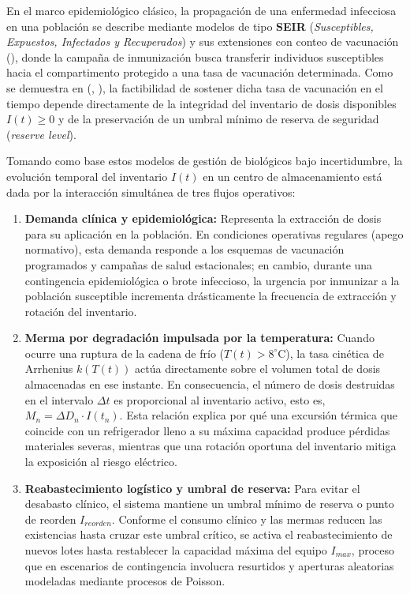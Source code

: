 \documentclass[
  spanish,
  us-letterpaper,
]{scrreprt}
\providecommand{\tightlist}{%
  \setlength{\itemsep}{0pt}\setlength{\parskip}{0pt}}
\numberwithin{equation}{section}
\theoremstyle{plain}
\theoremstyle{plain}
\theoremstyle{definition}
\theoremstyle{plain}
\theoremstyle{remark}
\begin{document}
En el marco epidemiológico clásico, la propagación de una enfermedad
infecciosa en una población se describe mediante modelos de tipo
\textbf{SEIR} (\emph{Susceptibles, Expuestos, Infectados y Recuperados})
y sus extensiones con conteo de vacunación
(), donde la campaña de inmunización busca transferir individuos
susceptibles hacia el compartimento protegido a una tasa de vacunación
determinada. Como se demuestra en
(, ), la
factibilidad de sostener dicha tasa de vacunación en el tiempo depende
directamente de la integridad del inventario de dosis disponibles
\(I(t) \ge 0\) y de la preservación de un umbral mínimo de reserva de
seguridad (\emph{reserve level}).

Tomando como base estos modelos de gestión de biológicos bajo
incertidumbre, la evolución temporal del inventario \(I(t)\) en un
centro de almacenamiento está dada por la interacción simultánea de tres
flujos operativos:

\begin{enumerate}
\def\labelenumi{\arabic{enumi}.}
\tightlist
\item
  \textbf{Demanda clínica y epidemiológica:} Representa la extracción de
  dosis para su aplicación en la población. En condiciones operativas
  regulares (apego normativo), esta demanda responde a los esquemas de
  vacunación programados y campañas de salud estacionales; en cambio,
  durante una contingencia epidemiológica o brote infeccioso, la
  urgencia por inmunizar a la población susceptible incrementa
  drásticamente la frecuencia de extracción y rotación del inventario.
\item
  \textbf{Merma por degradación impulsada por la temperatura:} Cuando
  ocurre una ruptura de la cadena de frío (\(T(t) > 8^\circ\text{C}\)),
  la tasa cinética de Arrhenius \(k(T(t))\) actúa directamente sobre el
  volumen total de dosis almacenadas en ese instante. En consecuencia,
  el número de dosis destruidas en el intervalo \(\Delta t\) es
  proporcional al inventario activo, esto es,
  \(M_n = \Delta D_n \cdot I(t_n)\). Esta relación explica por qué una
  excursión térmica que coincide con un refrigerador lleno a su máxima
  capacidad produce pérdidas materiales severas, mientras que una
  rotación oportuna del inventario mitiga la exposición al riesgo
  eléctrico.
\item
  \textbf{Reabastecimiento logístico y umbral de reserva:} Para evitar
  el desabasto clínico, el sistema mantiene un umbral mínimo de reserva
  o punto de reorden \(I_{reorden}\). Conforme el consumo clínico y las
  mermas reducen las existencias hasta cruzar este umbral crítico, se
  activa el reabastecimiento de nuevos lotes hasta restablecer la
  capacidad máxima del equipo \(I_{max}\), proceso que en escenarios de
  contingencia involucra resurtidos y aperturas aleatorias modeladas
  mediante procesos de Poisson.
\end{enumerate}
\end{document}
